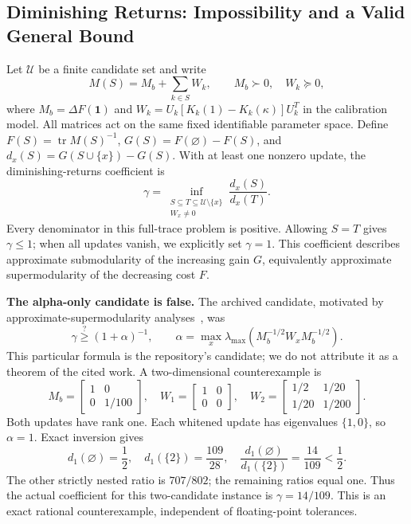 \subsection{Diminishing Returns: Impossibility and a Valid General Bound}
\label{sec:gamma-resolution}

Let $\mathcal U$ be a finite candidate set and write
\begin{equation}
M(S)=M_b+\sum_{k\in S}W_k,\qquad M_b\succ0,\quad W_k\succeq0,
\end{equation}
where $M_b=\Delta F(\mathbf1)$ and $W_k=U_k[K_k(1)-K_k(\kappa)]U_k^T$ in the calibration model. All matrices act on the same fixed identifiable parameter space. Define $F(S)=\operatorname{tr}M(S)^{-1}$, $G(S)=F(\varnothing)-F(S)$, and $d_x(S)=G(S\cup\{x\})-G(S)$. With at least one nonzero update, the diminishing-returns coefficient is
\begin{equation}
\gamma=\inf_{\substack{S\subseteq T\subseteq\mathcal U\setminus\{x\}\\W_x\ne0}}
\frac{d_x(S)}{d_x(T)}.
\label{eq:gamma-definition}
\end{equation}
Every denominator in this full-trace problem is positive. Allowing $S=T$ gives $\gamma\leq1$; when all updates vanish, we explicitly set $\gamma=1$. This coefficient describes approximate submodularity of the increasing gain $G$, equivalently approximate supermodularity of the decreasing cost $F$.

\textbf{The alpha-only candidate is false.} The archived candidate, motivated by approximate-supermodularity analyses~\cite{chamon2017}, was
\begin{equation}
\gamma\stackrel{?}{\geq}(1+\alpha)^{-1},\qquad
\alpha=\max_x\lambda_{\max}(M_b^{-1/2}W_xM_b^{-1/2}).
\label{eq:candidate-gamma}
\end{equation}
This particular formula is the repository's candidate; we do not attribute it as a theorem of the cited work. A two-dimensional counterexample is
\begin{equation}
M_b=\begin{bmatrix}1&0\\0&1/100\end{bmatrix},\quad
W_1=\begin{bmatrix}1&0\\0&0\end{bmatrix},\quad
W_2=\begin{bmatrix}1/2&1/20\\1/20&1/200\end{bmatrix}.
\label{eq:gamma-counterexample}
\end{equation}
Both updates have rank one. Each whitened update has eigenvalues $\{1,0\}$, so $\alpha=1$. Exact inversion gives
\begin{equation}
d_1(\varnothing)=\frac12,\quad d_1(\{2\})=\frac{109}{28},\quad
\frac{d_1(\varnothing)}{d_1(\{2\})}=\frac{14}{109}<\frac12.
\end{equation}
The other strictly nested ratio is $707/802$; the remaining ratios equal one. Thus the actual coefficient for this two-candidate instance is $\gamma=14/109$. This is an exact rational counterexample, independent of floating-point tolerances.

